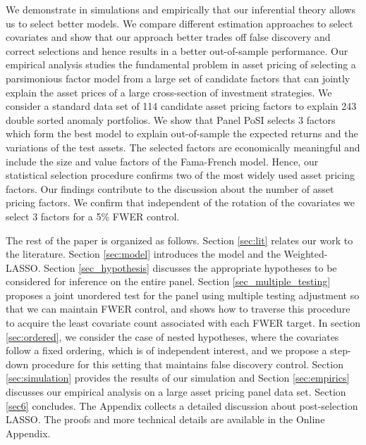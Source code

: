 \documentclass[11pt]{article}
\begin{document}
	
	We demonstrate in simulations and empirically that our inferential theory allows us to select better models. We compare different estimation approaches to select covariates and show that our approach better trades off false discovery and correct selections and hence results in a better out-of-sample performance. Our empirical analysis studies the fundamental problem in asset pricing of selecting a parsimonious factor model from a large set of candidate factors that can jointly explain the asset prices of a large cross-section of investment strategies. We consider a standard data set of 114 candidate asset pricing factors to explain 243 double sorted anomaly portfolios. We show that Panel PoSI selects 3 factors which form the best model to explain out-of-sample the expected returns and the variations of the test assets. The selected factors are economically meaningful and include the size and value factors of the Fama-French model. Hence, our statistical selection procedure confirms two of the most widely used asset pricing factors. Our findings contribute to the discussion about the number of asset pricing factors. We confirm that independent of the rotation of the covariates we select 3 factors for a 5\% FWER control.  
	
	
	
	The rest of the paper is organized as follows. Section \ref{sec:lit} relates our work to the literature. Section \ref{sec:model} introduces the model and the Weighted-LASSO. Section \ref{sec_hypothesis} discusses the appropriate hypotheses to be considered for inference on the entire panel. Section \ref{sec_multiple_testing} proposes a joint unordered test for the panel using multiple testing adjustment so that we can maintain FWER control, and shows how to traverse this procedure to acquire the least covariate count associated with each FWER target. In section \ref{sec:ordered}, we consider the case of nested hypotheses, where the covariates follow a fixed ordering, which is of independent interest, and we propose a step-down procedure for this setting that maintains false discovery control. Section \ref{sec:simulation} provides the results of our simulation and Section \ref{sec:empirics} discusses our empirical analysis on a large asset pricing panel data set. Section \ref{sec6} concludes. The Appendix collects a detailed discussion about post-selection LASSO. The proofs and more technical details are available in the Online Appendix.
	
\end{document}
